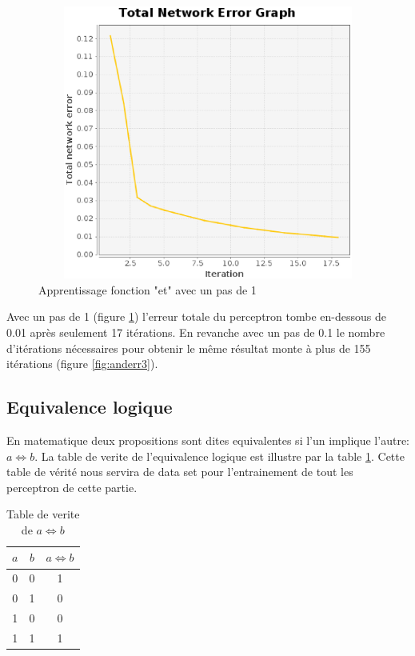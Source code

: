 \documentclass[twoside,openright,a4paper,11pt,french]{article}
\begin{document}
\begin{figure}[h]
\centering
\includegraphics[width=12cm,height=9cm]{./pics/and_error4.eps}
\caption{Apprentissage fonction "et" avec un pas de 1}
\label{fig:anderr4}
\end{figure}

Avec un pas de 1 (figure \ref{fig:anderr4}) l'erreur totale du perceptron
tombe en-dessous de 0.01 après seulement 17 itérations. En revanche avec 
un pas de 0.1 le nombre d'itérations nécessaires pour obtenir le même
résultat monte à plus de 155 itérations (figure \ref{fig:anderr3}).

\subsection{Equivalence logique}
En matematique deux propositions sont dites equivalentes si l'un implique
l'autre: $a \Leftrightarrow b$. La table de verite de l'equivalence logique
est illustre par la table \ref{tab:eq}.
Cette table de vérité nous servira de data set pour l'entrainement de tout
les perceptron de cette partie.


\begin{table}[h]
  \centering
  \begin{tabular}{| c | c | c |}
    \hline
    \textbf{$a$} & \textbf{$b$} & \textbf{$a \Leftrightarrow b$}\\
    \hline
    0 & 0  & 1 \\
    \hline
    0 & 1  & 0 \\
    \hline
    1 & 0  & 0 \\
    \hline
    1 & 1  & 1 \\
    \hline
  \end{tabular}
  \caption{Table de verite de $a \Leftrightarrow b$}
  \label{tab:eq}
\end{table}
\end{document}
